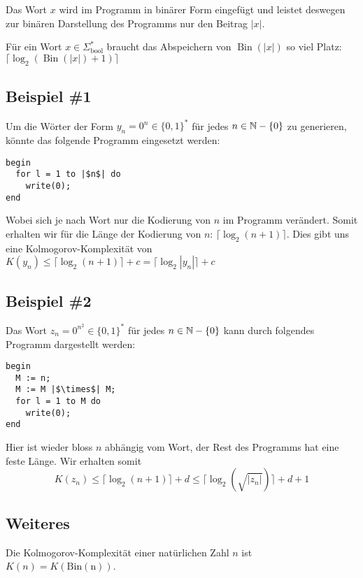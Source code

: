 Das Wort $x$ wird im Programm in binärer Form eingefügt und leistet deswegen zur binären Darstellung des Programms nur den Beitrag $|x|$.\\

\begin{remark}
Für ein Wort $x \in \Sigma_\text{bool}^*$ braucht das Abspeichern von $\operatorname{Bin}(|x|)$ so viel Platz: $\lceil \log_2 (\operatorname{Bin}(|x|) + 1) \rceil$
\end{remark}

\subsection{Beispiel \#1}
Um die Wörter der Form $y_n = 0^n \in \{0, 1\}^*$ für jedes $n \in \mathbb{N} - \{0\}$ zu generieren, könnte das folgende Programm eingesetzt werden:
\begin{lstlisting}
begin
  for l = 1 to |$n$| do
    write(0);
end
\end{lstlisting}

Wobei sich je nach Wort nur die Kodierung von $n$ im Programm verändert. Somit erhalten wir für die Länge der Kodierung von $n$: $\lceil \log_2(n + 1) \rceil$. Dies gibt uns eine Kolmogorov-Komplexität von $K(y_n) \leq \lceil \log_2(n+1) \rceil + c = \lceil \log_2 |y_n| \rceil + c$

\subsection{Beispiel \#2}
Das Wort $z_n = 0^{n^2} \in \{0, 1\}^*$ für jedes $n \in \mathbb{N} - \{0\}$ kann durch folgendes Programm dargestellt werden:
\begin{lstlisting}
begin
  M := n;
  M := M |$\times$| M;
  for l = 1 to M do
    write(0);
end
\end{lstlisting}

Hier ist wieder bloss $n$ abhängig vom Wort, der Rest des Programms hat eine feste Länge. Wir erhalten somit
\[
K(z_n) \leq \lceil \log_2 (n+1) \rceil + d \leq \lceil \log_2 (\sqrt{|z_n|}) \rceil + d + 1
\]

\subsection{Weiteres}
\begin{definition}
Die Kolmogorov-Komplexität einer natürlichen Zahl $n$ ist $K(n) = K(\operatorname{Bin(n)})$.
\end{definition}

